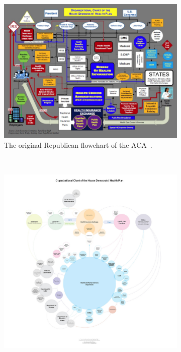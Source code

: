\documentclass{vgtc}                          %
\begin{document}
\begin{figure}
	\centering
	\begin{subfigure}{0.9\columnwidth}
		\includegraphics[width=\textwidth]{pictures/healthdirty.jpg}
		\caption{The original Republican flowchart of the ACA~\protect\cite{boehner}.}
	\end{subfigure}
	~
	\begin{subfigure}{0.9\columnwidth}
		\includegraphics[width=\textwidth]{pictures/healthclean.jpg}

\end{subfigure}
\end{figure}
\end{document}
